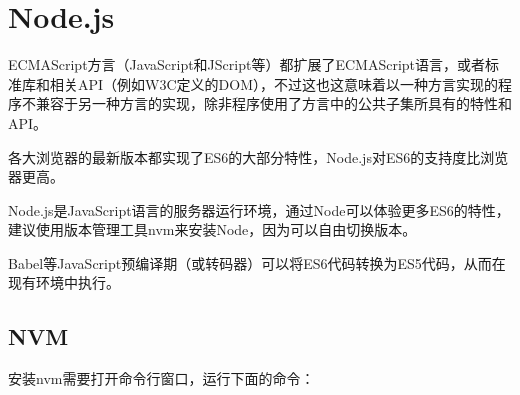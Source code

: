 \begin{lstlisting}[language=JavaScript]

\end{lstlisting}


\chapter{Node.js}

ECMAScript方言（JavaScript和JScript等）都扩展了ECMAScript语言，或者标准库和相关API（例如W3C定义的DOM），不过这也这意味着以一种方言实现的程序不兼容于另一种方言的实现，除非程序使用了方言中的公共子集所具有的特性和API。

各大浏览器的最新版本都实现了ES6的大部分特性，Node.js对ES6的支持度比浏览器更高。

Node.js是JavaScript语言的服务器运行环境，通过Node可以体验更多ES6的特性，建议使用版本管理工具nvm来安装Node，因为可以自由切换版本。

Babel等JavaScript预编译期（或转码器）可以将ES6代码转换为ES5代码，从而在现有环境中执行。

\section{NVM}


安装nvm需要打开命令行窗口，运行下面的命令：

